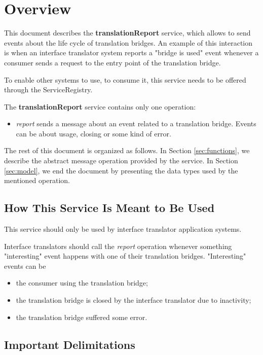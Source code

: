 \documentclass[a4paper]{arrowhead}
\begin{document}
\section{Overview}
\label{sec:overview}
This document describes the \textbf{translationReport} service, which allows to send events about the life cycle of translation bridges. An example of this interaction is when an interface translator system reports a "bridge is used" event whenever a consumer sends a request to the entry point of the translation bridge.

To enable other systems to use, to consume it, this service needs to be offered through the ServiceRegistry.

The \textbf{translationReport} service contains only one operation:

\begin{itemize}
    \item \textit{report} sends a message about an event related to a translation bridge. Events can be about usage, closing or some kind of error.
\end{itemize}

The rest of this document is organized as follows.
In Section \ref{sec:functions}, we describe the abstract message operation provided by the service.
In Section \ref{sec:model}, we end the document by presenting the data types used by the mentioned operation.

\subsection{How This Service Is Meant to Be Used}

This service should only be used by interface translator application systems.

Interface translators should call the \textit{report} operation whenever something "interesting" event happens with one of their translation bridges. "Interesting" events can be 

\begin{itemize}
    \item the consumer using the translation bridge;
    \item the translation bridge is closed by the interface translator due to inactivity;
    \item the translation bridge suffered some error.
\end{itemize}

\subsection{Important Delimitations}
\label{sec:delimitations}
\end{document}
